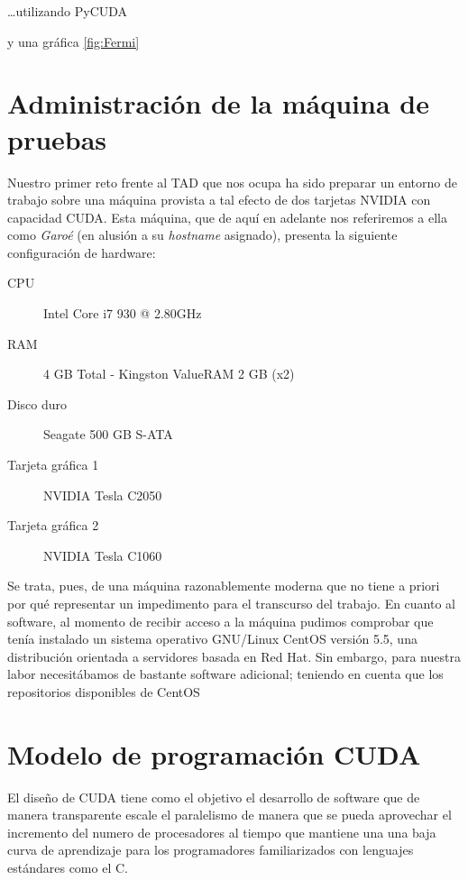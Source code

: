 \documentclass[twoside]{article}
\begin{document}
\ldots utilizando PyCUDA~\cite{DBLP:journals/corr/abs-0911-3456}

y una gráfica \ref{fig:Fermi}


\section{Administración de la máquina de pruebas}

Nuestro primer reto frente al TAD que nos ocupa ha sido preparar un entorno de trabajo sobre una máquina provista a tal efecto de dos tarjetas NVIDIA con capacidad CUDA. Esta máquina, que de aquí en adelante nos referiremos a ella como \emph{Garoé} (en alusión a su \emph{hostname} asignado), presenta la siguiente configuración de hardware:

\begin{description}
   \item[CPU] Intel Core i7 930 @ 2.80GHz
   \item[RAM] 4 GB Total - Kingston ValueRAM 2 GB (x2)
   \item[Disco duro] Seagate 500 GB S-ATA
   \item[Tarjeta gráfica 1] NVIDIA Tesla C2050
   \item[Tarjeta gráfica 2] NVIDIA Tesla C1060
\end{description}

Se trata, pues, de una máquina razonablemente moderna que no tiene a priori por qué representar un impedimento para el transcurso del trabajo. En cuanto al software, al momento de recibir acceso a la máquina pudimos comprobar que tenía instalado un sistema operativo GNU/Linux CentOS versión 5.5, una distribución orientada a servidores basada en Red Hat. Sin embargo, para nuestra labor necesitábamos de bastante software adicional; teniendo en cuenta que los repositorios disponibles de CentOS


\section{Modelo de programación CUDA}

El diseño de CUDA tiene como el objetivo el desarrollo de software que de manera transparente escale el paralelismo de manera que se pueda aprovechar el incremento del numero de procesadores al tiempo que mantiene una una baja curva de aprendizaje para los programadores familiarizados con lenguajes estándares como el C.
\end{document}
